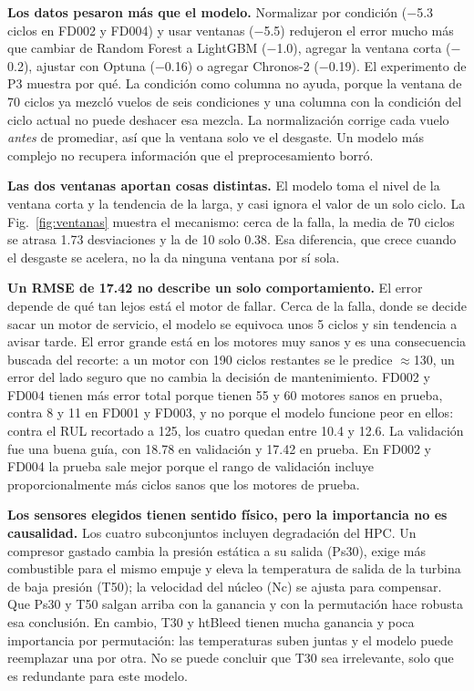 \documentclass[conference]{IEEEtran}
\begin{document}
\textbf{Los datos pesaron más que el modelo.} Normalizar por condición ($-$5.3 ciclos en FD002 y FD004) y usar ventanas ($-$5.5) redujeron el error mucho más que cambiar de Random Forest a LightGBM ($-$1.0), agregar la ventana corta ($-$0.2), ajustar con Optuna ($-$0.16) o agregar Chronos-2 ($-$0.19). El experimento de P3 muestra por qué. La condición como columna no ayuda, porque la ventana de 70 ciclos ya mezcló vuelos de seis condiciones y una columna con la condición del ciclo actual no puede deshacer esa mezcla. La normalización corrige cada vuelo \emph{antes} de promediar, así que la ventana solo ve el desgaste. Un modelo más complejo no recupera información que el preprocesamiento borró.

\textbf{Las dos ventanas aportan cosas distintas.} El modelo toma el nivel de la ventana corta y la tendencia de la larga, y casi ignora el valor de un solo ciclo. La Fig.~\ref{fig:ventanas} muestra el mecanismo: cerca de la falla, la media de 70 ciclos se atrasa 1.73 desviaciones y la de 10 solo 0.38. Esa diferencia, que crece cuando el desgaste se acelera, no la da ninguna ventana por sí sola.

\textbf{Un RMSE de 17.42 no describe un solo comportamiento.} El error depende de qué tan lejos está el motor de fallar. Cerca de la falla, donde se decide sacar un motor de servicio, el modelo se equivoca unos 5 ciclos y sin tendencia a avisar tarde. El error grande está en los motores muy sanos y es una consecuencia buscada del recorte: a un motor con 190 ciclos restantes se le predice $\approx$130, un error del lado seguro que no cambia la decisión de mantenimiento. FD002 y FD004 tienen más error total porque tienen 55 y 60 motores sanos en prueba, contra 8 y 11 en FD001 y FD003, y no porque el modelo funcione peor en ellos: contra el RUL recortado a 125, los cuatro quedan entre 10.4 y 12.6. La validación fue una buena guía, con 18.78 en validación y 17.42 en prueba. En FD002 y FD004 la prueba sale mejor porque el rango de validación incluye proporcionalmente más ciclos sanos que los motores de prueba.

\textbf{Los sensores elegidos tienen sentido físico, pero la importancia no es causalidad.} Los cuatro subconjuntos incluyen degradación del HPC. Un compresor gastado cambia la presión estática a su salida (Ps30), exige más combustible para el mismo empuje y eleva la temperatura de salida de la turbina de baja presión (T50); la velocidad del núcleo (Nc) se ajusta para compensar. Que Ps30 y T50 salgan arriba con la ganancia y con la permutación hace robusta esa conclusión. En cambio, T30 y htBleed tienen mucha ganancia y poca importancia por permutación: las temperaturas suben juntas y el modelo puede reemplazar una por otra. No se puede concluir que T30 sea irrelevante, solo que es redundante para este modelo.
\end{document}
